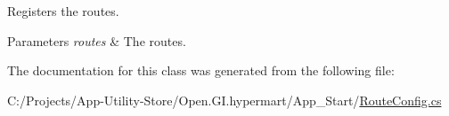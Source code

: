 Registers the routes. 


\begin{DoxyParams}{Parameters}
{\em routes} & The routes.\\
\hline
\end{DoxyParams}


The documentation for this class was generated from the following file\+:\begin{DoxyCompactItemize}
\item 
C\+:/\+Projects/\+App-\/\+Utility-\/\+Store/\+Open.\+G\+I.\+hypermart/\+App\+\_\+\+Start/\hyperlink{_route_config_8cs}{Route\+Config.\+cs}\end{DoxyCompactItemize}
